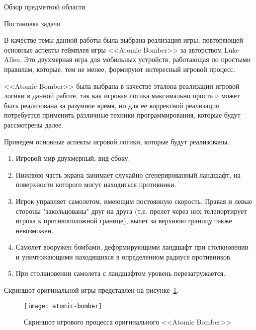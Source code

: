 	\begin{section}{Обзор предметной области}

		\begin{subsection}{Постановка задачи}

			В качестве темы данной работы была выбрана реализация игры, повторяющей основные аспекты геймплея игры <<Atomic Bomber>> за авторством Luke Allen.
			Это двухмерная игра для мобильных устройств, работающая по простыми правилам, которые, тем не менее, формируют интересный игровой процесс.

			<<Atomic Bomber>> была выбрана в качестве эталона реализации игровой логики в данной работе, так как игровая логика максимально проста и может быть реализована за разумное время, но для ее корректной реализации потребуется применить различные техники программирования, которые будут рассмотрены далее.

			Приведем основные аспекты игровой логики, которые будут реализованы.

			\begin{enumerate}
				\item Игровой мир двухмерный, вид сбоку.
				\item Нижнюю часть экрана занимает случайно сгенерированный ландшафт, на поверхности которого могут находиться противники.
				\item Игрок управляет самолетом, имеющим постоянную скорость.
				Правая и левые стороны "закольцованы" друг на друга (т.е. пролет через них телепортирует игрока к противоположной границе), вылет за верхнюю границу также невозможен.
				\item Самолет вооружен бомбами, деформирующими ландшафт при столкновении и уничтожающими находящихся в определенном радиусе противников.
				\item При столкновении самолета с ландшафтом уровень перезагружается.
			\end{enumerate}

			Скриншот оригинальной игры представлен на рисунке~\ref{atomic-bomber}.

			\begin{figure}[H]
				\texttt{[image: atomic-bomber]}
				\caption{Скриншот игрового процесса оригинального <<Atomic Bomber>>}
				\label{atomic-bomber}
			\end{figure}
		\end{subsection}


\end{section}
